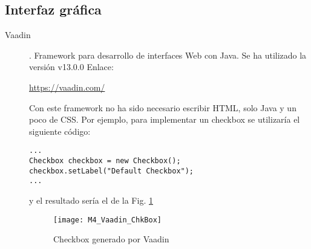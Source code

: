 \subsection{Interfaz gráfica}
\begin{description}
	\item[Vaadin]. Framework para desarrollo de interfaces Web con Java.
		Se ha utilizado la versión  v13.0.0 Enlace:
		
		\url{https://vaadin.com/}
		
		Con este framework no ha sido necesario escribir HTML, solo Java y un poco de CSS. Por ejemplo, para implementar un checkbox se utilizaría el siguiente código:
		
\begin{minipage}{\linewidth}
\begin{lstlisting}
...
Checkbox checkbox = new Checkbox();
checkbox.setLabel("Default Checkbox");
...
\end{lstlisting}
\end{minipage}	
		y el resultado sería el de la Fig. \ref{fig:M4_Vaadin_ChkBox}
\begin{figure}[!h]
	\centering
	\texttt{[image: M4\_Vaadin\_ChkBox]}
	\caption{Checkbox generado por Vaadin}\label{fig:M4_Vaadin_ChkBox}
\end{figure}
\FloatBarrier

\end{description}
